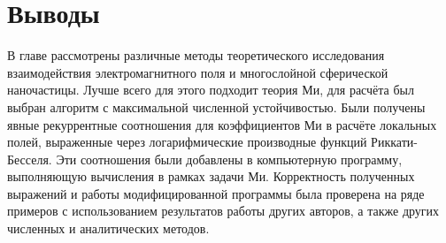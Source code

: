\section{Выводы}

В главе рассмотрены различные методы теоретического исследования
взаимодействия электромагнитного поля и многослойной сферической
наночастицы. Лучше всего для этого подходит теория Ми, для расчёта был
выбран алгоритм с максимальной численной устойчивостью.  Были получены
явные рекуррентные соотношения для коэффициентов Ми в расчёте
локальных полей, выраженные через логарифмические производные функций
Риккати-Бесселя.  Эти соотношения были добавлены в компьютерную
программу, выполняющую вычисления в рамках задачи Ми. Корректность
полученных выражений и работы модифицированной программы была
проверена на ряде примеров с использованием результатов работы других
авторов, а также других численных и аналитических методов.




\clearpage
